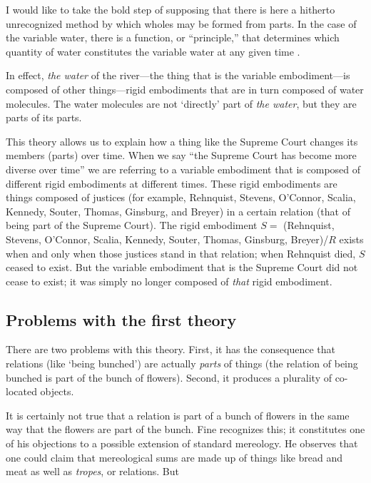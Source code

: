 \documentclass[11pt]{article}
\newenvironment{squote}{%
\begin{spacing}{1}
\begin{list}{}{%
\setlength{\labelwidth}{0pt}%
\rightmargin\leftmargin%
}
\item\relax
}{%
\end{list}%
\end{spacing}
}
\begin{document}
\begin{spacing}{1.5}
\begin{squote}
I would like to take the bold step of supposing that there is here a
hitherto unrecognized method by which wholes may be formed from parts.
In the case of the variable water, there is a function, or
``principle,'' that determines which quantity of water constitutes the
variable water at any given time \citeyearpar[68]{fine1999}.
\end{squote}

In effect, {\em the water} of the river---the thing that is the
variable embodiment---is composed of other things---rigid embodiments
that are in turn composed of water molecules.  The water molecules are
not `directly' part of {\em the water}, but they are parts of its
parts.

This theory allows us to explain how a thing like the Supreme Court
changes its members (parts) over time.  When we say ``the Supreme
Court has become more diverse over time'' we are referring to a
variable embodiment that is composed of different rigid embodiments at
different times.  These rigid embodiments are things composed of
justices (for example, Rehnquist, Stevens, O'Connor, Scalia, Kennedy,
Souter, Thomas, Ginsburg, and Breyer) in a certain relation (that of
being part of the Supreme Court).  The rigid embodiment $S =$
(Rehnquist, Stevens, O'Connor, Scalia, Kennedy, Souter, Thomas,
Ginsburg, Breyer)/$R$ exists when and only when those justices stand
in that relation; when Rehnquist died, $S$ ceased to exist.  But the
variable embodiment that is the Supreme Court did not cease to exist;
it was simply no longer composed of {\em that} rigid embodiment.

\subsection{Problems with the first theory}
\label{problems1}
There are two problems with this theory.  First, it has the
consequence that relations (like `being bunched') are actually {\em
  parts} of things (the relation of being bunched is part of the bunch
of flowers).  Second, it produces a plurality of co-located objects.

It is certainly not true that a relation is part of a bunch of flowers
in the same way that the flowers are part of the bunch.  Fine
recognizes this; it constitutes one of his objections to a possible
extension of standard mereology.  He observes that one could claim
that mereological sums are made up of things like bread and meat as
well as {\em tropes}, or relations.  But


\end{spacing}
\end{document}
